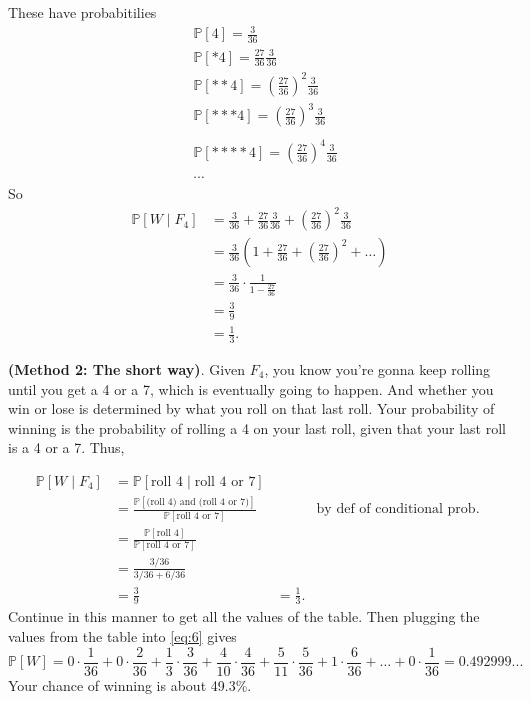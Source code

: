 \documentclass[10pt]{article}
\theoremstyle{definition}
\newcommand{\1}[1]{\textbf{1}_{\left[#1\right]}} %
\def\P{\mathbb{P}} %
\begin{document}
These have probabitilies
\begin{align*}
  &\P\left[4\right] = \frac{3}{36}\\ 
  &\P\left[*4\right] = \frac{27}{36} \frac{3}{36}\\
  &\P\left[**4\right] = \left( \frac{27}{36} \right)^{2} \frac{3}{36} \\
  &\P\left[***4\right]= \left( \frac{27}{36} \right)^{3} \frac{3}{36} \\\\
  &\P\left[****4\right] = \left( \frac{27}{36} \right)^{4} \frac{3}{36} \\\\
  &\cdots
\end{align*}
So
\begin{align*}
  \P\left[W\mid F_{4} \right] 
  &= \frac{3}{36}+ \frac{27}{36}\frac{3}{36}+ \left( \frac{27}{36} \right)^{2} \frac{3}{36} \\
  &= \frac{3}{36} \left( 1 + \frac{27}{36} + \left( \frac{27}{36} \right)^{2}+\ldots  \right) \\
  &= \frac{3}{36}\cdot \frac{1}{1-\frac{27}{36}} \\
  &= \frac{3}{9} \\
  &= \frac{1}{3}.
\end{align*}

\textbf{(Method 2: The short way)}. Given $F_{4}$, you know you're gonna keep rolling until you get a 4 or
a 7, which is eventually going to happen. And whether you win or lose is determined by what you roll on
that last roll. Your probability of winning is the probability of rolling a 4 on your last roll, given
that your last roll is a 4 or a 7. Thus,

\begin{align*}
  \P\left[W\mid F_{4} \right] 
  &= \P\left[ \text{roll 4} \mid \text{roll 4 or 7} \right] \\
  &= \frac{\P\left[ \text{(roll 4) and (roll 4 or 7)} \right]}{\P\left[ \text{roll 4 or 7} \right]}
  &&\text{by def of conditional prob. }\\
  &= \frac{\P\left[ \text{roll 4} \right]}{\P\left[\text{roll 4 or 7} \right]} \\
  &= \frac{3/36}{3/36+6/36}\\
  &= \frac{3}{9}
  &= \frac{1}{3}.
\end{align*}
Continue in this manner to get all the values of the table. Then plugging the values from the table into
\cref{eq:6} gives
\begin{equation*}
  \P\left[W \right] =
  0\cdot \frac{1}{36}
  + 0\cdot\frac{2}{36}
  + \frac{1}{3}\cdot\frac{3}{36}
  + \frac{4}{10}\cdot\frac{4}{36}
  + \frac{5}{11}\cdot\frac{5}{36}
  + 1\cdot\frac{6}{36}
  +\ldots
  + 0\cdot \frac{1}{36} = 0.492999...
\end{equation*}
Your chance of winning is about 49.3\%.
\end{document}
